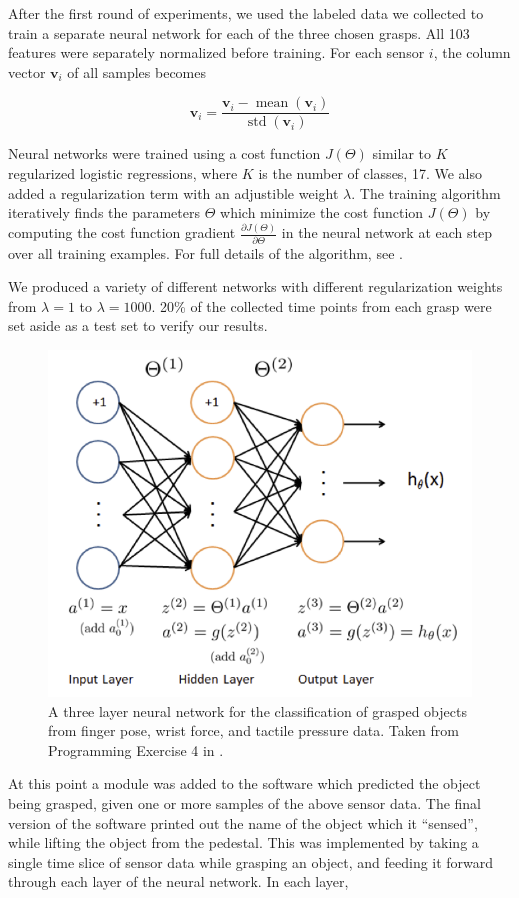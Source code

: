 \newcommand{\vi}{\mathbf{v}_i}
\newcommand{\h}[1]{\mathbf{a}^{(#1)}}
\newcommand{\layer}[1]{\Theta^{(#1)}}
\newcommand{\e}{\mathbf{e}}
\newcommand{\sig}{\operatorname{sigmoid}}

After the first round of experiments, we used the labeled data we collected to train a separate neural network for each of the three chosen grasps. All 103 features were separately normalized before training. For each sensor $i$, the column vector $\vi$ of all samples becomes

$$ \vi = \frac{\vi - \operatorname{mean}(\vi)}{\operatorname{std}(\vi)} $$

Neural networks were trained using a cost function $J(\Theta)$ similar to $K$ regularized logistic regressions, where $K$ is the number of classes, 17. We also added a regularization term with an adjustible weight $\lambda$. The training algorithm iteratively finds the parameters $\Theta$ which minimize the cost function $J(\Theta)$ by computing the cost function gradient $\frac{\partial J(\Theta)}{\partial\Theta}$ in the neural network at each step over all training examples. For full details of the algorithm, see \cite{ML9}.

We produced a variety of different networks with different regularization weights from $\lambda = 1$ to $\lambda = 1000$. 20\% of the collected time points from each grasp were set aside as a test set to verify our results.\\
\begin{figure}[t]
\begin{center}
	\includegraphics[width=.45\textwidth]{nn.png}
	\caption{A three layer neural network for the classification of grasped objects from finger pose, wrist force, and tactile pressure data. Taken from Programming Exercise 4 in \cite{ML}.}
	\label{nn_config}
\end{center}
\end{figure}
\vspace{-0.5cm}

\quad At this point a module was added to the software which predicted the object being grasped, given one or more samples of the above sensor data. The final version of the software printed out the name of the object which it ``sensed'', while lifting the object from the pedestal. This was implemented by taking a single time slice of sensor data while grasping an object, and feeding it forward through each layer of the neural network. In each layer,


